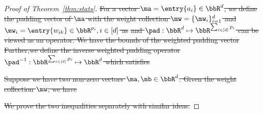 \documentclass[lettersize,onecolumn,journal]{IEEEtran}
\theoremstyle{definition}
\newtheorem{lem}{Lemma}
\theoremstyle{definition}
\newtheorem{defn}{Definition}
\providecommand{\DIFdeltex}[1]{{\protect\color{red}\sout{#1}}}                      %
\providecommand{\DIFdel}[1]{\texorpdfstring{\DIFdeltex{#1}}{}} %
\begin{document}
\begin{proof}[Proof of Theorem~\ref{thm:stats}]
\DIFdel{For a vector $\ma = \entry{a_i} \in \bbR^d$, we define the padding vector of $\ma$ with the weight collection $\mw = \{\mw_i\}_{i = 1}^d$ and $\mw_i = \entry{w_{ik}} \in \bbR^{p_i}, i \in [d]$ as
}%
\DIFdel{and $\pad: \bbR^{d}\mapsto \bbR^{\sum_{i\in[d]}p_i}$ can be viewed as an operator.
We have the bounds of the weighted padding vector
}%
\DIFdel{Further,we define the inverse weighted padding operator $\pad^{-1}: \bbR^{\sum_{i\in[d]}p_i}\mapsto \bbR^d$ which satisfies 
}%

\DIFdel{Suppose we have two non-zero vectors $\ma, \mb \in \bbR^d$. Given the weight collection $\mw$, we have 
}%

\DIFdel{We prove the two inequalities separately with similar ideas.
}%


\end{proof}
\end{document}
